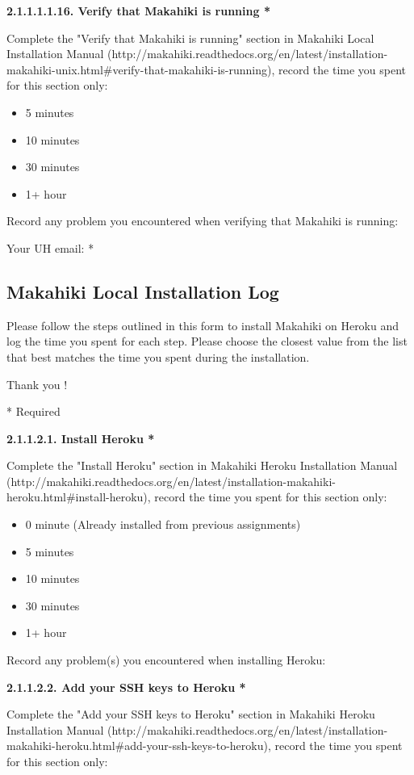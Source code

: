 {\bf 2.1.1.1.1.16. Verify that Makahiki is running *}

Complete the "Verify that Makahiki is running" section in Makahiki Local Installation Manual (http://makahiki.readthedocs.org/en/latest/installation-makahiki-unix.html\#verify-that-makahiki-is-running), record the time you spent for this section only:

\begin{itemize}
\item 5 minutes
\item  10 minutes
\item  30 minutes
\item  1+ hour
\end{itemize}

Record any problem you encountered when verifying that Makahiki is running:

Your UH email: *

\subsection{Makahiki Local Installation Log}

Please follow the steps outlined in this form to install Makahiki on Heroku and log the time you spent for each step.
Please choose the closest value from the list that best matches the time you spent during the installation.

Thank you !

* Required

{\bf 2.1.1.2.1. Install Heroku *}

Complete the "Install Heroku" section in Makahiki Heroku Installation Manual (http://makahiki.readthedocs.org/en/latest/installation-makahiki-heroku.html\#install-heroku), record the time you spent for this section only:

\begin{itemize}
\item 0 minute (Already installed from previous assignments)
\item 5 minutes
\item  10 minutes
\item  30 minutes
\item  1+ hour
\end{itemize}

Record any problem(s) you encountered when installing Heroku:

{\bf 2.1.1.2.2. Add your SSH keys to Heroku *}

Complete the "Add your SSH keys to Heroku" section in Makahiki Heroku Installation Manual (http://makahiki.readthedocs.org/en/latest/installation-makahiki-heroku.html\#add-your-ssh-keys-to-heroku), record the time you spent for this section only:

